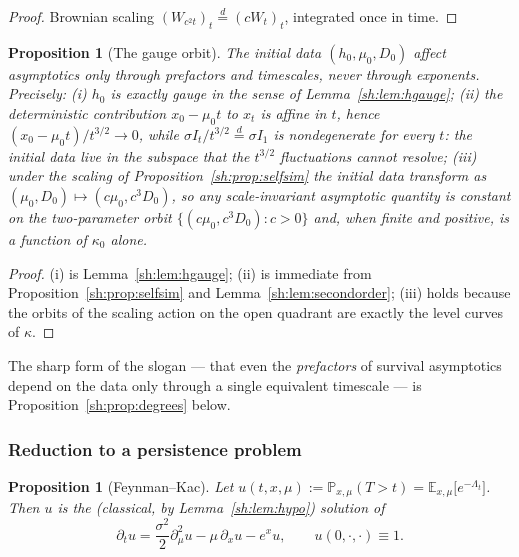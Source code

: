 \documentclass[11pt]{article}
\numberwithin{equation}{section}
\theoremstyle{plain}
\newtheorem{proposition}[theorem]{Proposition}
\theoremstyle{definition}
\theoremstyle{remark}
\newcommand{\E}{\mathbb{E}}
\newcommand{\PP}{\mathbb{P}}
\newcommand{\eqd}{\overset{d}{=}}
\begin{document}
\begin{proof}
Brownian scaling $(W_{c^2t})_t\eqd(cW_t)_t$, integrated once in time.
\end{proof}

\begin{proposition}[The gauge orbit]\label{sh:prop:gauge}
The initial data $(h_0,\mu_0,D_0)$ affect asymptotics only through
prefactors and timescales, never through exponents. Precisely:
\emph{(i)} $h_0$ is exactly gauge in the sense of
Lemma~\ref{sh:lem:hgauge};
\emph{(ii)} the deterministic contribution
$x_0-\mu_0t$ to $x_t$ is affine in $t$, hence
$(x_0-\mu_0t)/t^{3/2}\to0$, while $\sigma I_t/t^{3/2}\eqd\sigma I_1$ is
nondegenerate for every $t$: the initial data live in the subspace that the
$t^{3/2}$ fluctuations cannot resolve;
\emph{(iii)} under the scaling of Proposition~\ref{sh:prop:selfsim} the
initial data transform as $(\mu_0,D_0)\mapsto(c\mu_0,c^3D_0)$, so any
scale-invariant asymptotic quantity is constant on the two-parameter orbit
$\{(c\mu_0,c^3D_0):c>0\}$ and, when finite and positive, is a function of
$\kappa_0$ alone.
\end{proposition}

\begin{proof}
(i) is Lemma~\ref{sh:lem:hgauge}; (ii) is immediate from
Proposition~\ref{sh:prop:selfsim} and Lemma~\ref{sh:lem:secondorder};
(iii) holds because the orbits of the scaling action on the open quadrant
are exactly the level curves of $\kappa$.
\end{proof}

The sharp form of the slogan --- that even the \emph{prefactors} of survival
asymptotics depend on the data only through a single equivalent timescale ---
is Proposition~\ref{sh:prop:degrees} below.

\subsubsection{Reduction to a persistence problem}\label{sh:subsub:reduction}

\begin{proposition}[Feynman--Kac]\label{sh:prop:FK}
Let $u(t,x,\mu):=\PP_{x,\mu}(T>t)=\E_{x,\mu}\bigl[e^{-\Lambda_t}\bigr]$.
Then $u$ is the (classical, by Lemma~\ref{sh:lem:hypo}) solution of
\begin{equation}\label{sh:eq:FK}
\partial_tu=\frac{\sigma^2}{2}\partial_\mu^2u-\mu\,\partial_xu-e^{x}u,
\qquad u(0,\cdot,\cdot)\equiv1 .
\end{equation}
\end{proposition}
\end{document}
